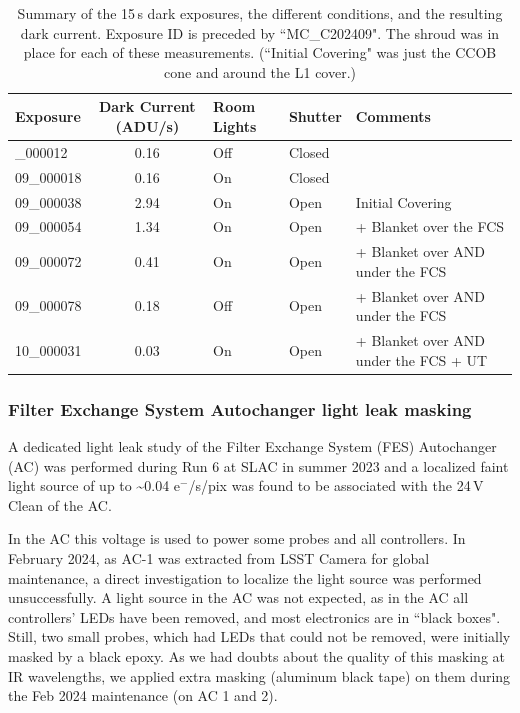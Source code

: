 {\small
\begin{longtable}[ht]{|l|c|l|l|l|}
\caption{Summary of the 15\,s dark exposures, the different conditions, and the resulting dark current.
Exposure ID is preceded by ``MC\_C202409".  The shroud was in place for each of these measurements.  (``Initial Covering" was just the CCOB cone and around the L1 cover.) \label{tab:leak_chasing}} \\
\hline
\textbf{Exposure} & \textbf{Dark Current} (ADU/s) & \textbf{Room Lights} &\textbf{Shutter} & \textbf{Comments} \\

\hline
\endfirsthead
\hline
\hline
\endhead
\hline
\endfoot
\hline
09\_000012 & 0.16 & Off & Closed & \\
09\_000018 & 0.16 & On & Closed & \\
09\_000038 & 2.94 & On & Open & Initial Covering  \\
09\_000054 & 1.34 & On & Open &  + Blanket over the FCS \\
09\_000072 & 0.41 & On & Open &  + Blanket over AND under the FCS \\
09\_000078 & 0.18 & Off & Open & + Blanket over AND under the FCS \\
10\_000031 & 0.03 & On & Open &  + Blanket over AND under the FCS + UT \\

\end{longtable}
}


\subsubsection{Filter Exchange System Autochanger light leak
masking}\label{successful-autochanger-light-leaks-masking}

A dedicated light leak study of the Filter Exchange System (FES) Autochanger (AC) was performed during Run 6 at SLAC
in summer 2023 and a localized faint light source of up to
\textasciitilde{}0.04 e$^-$/s/pix was found to be associated with the 24\,V Clean of
the AC.

In the AC this voltage is used to power some probes and all
controllers. In February 2024, as AC-1 was extracted from LSST Camera for
global maintenance, a direct investigation to localize the light
source was performed unsuccessfully. A light source in the AC
was not expected, as in the AC all controllers' LEDs have
been removed, and most electronics are in ``black boxes". Still, two small
probes, which had LEDs that could not be removed, were initially masked
by a black epoxy. As we had doubts about the quality of this masking at
IR wavelengths, we applied extra masking (aluminum black tape) on them during
the Feb 2024 maintenance (on AC 1 and 2).

